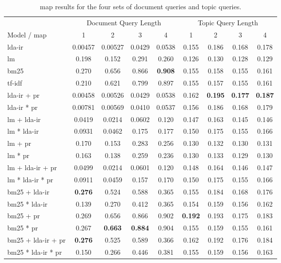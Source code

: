 \begin{table*}[h]
	\centering
	\caption{\acrlong{map} results for the four sets of document queries and topic queries.}
	\begin{tabular}{l|c|c|c|c|c|c|c|c}
		& \multicolumn{4}{c|}{Document Query Length} & \multicolumn{4}{c}{Topic Query Length} \\
		Model / \gls{map} & 1 & 2 & 3 & 4 & 1 & 2 & 3 & 4 \\
		\midrule
		\gls{lda}-\gls{ir} & 0.00457 & 0.00527 & 0.0429 & 0.0538 & 0.155 & 0.186 & 0.168 & 0.178 \\
		\gls{lm} & 0.198 & 0.152 & 0.291 & 0.260 & 0.126 & 0.130 & 0.128 & 0.129 \\
		\gls{bm25} & 0.270 & 0.656 & 0.866 & \textbf{0.908} & 0.155 & 0.158 & 0.155 & 0.161 \\
		\gls{tf-idf} & 0.210 & 0.621 & 0.799 & 0.897 & 0.155 & 0.157 & 0.155 & 0.161 \\
		\gls{lda}-\gls{ir} + \gls{pr} & 0.00458 & 0.00526 & 0.0429 & 0.0538 & 0.162 & \textbf{0.195} & \textbf{0.177} & \textbf{0.187} \\
		\gls{lda}-\gls{ir} * \gls{pr} & 0.00781 & 0.00569 & 0.0410 & 0.0537 & 0.156 & 0.186 & 0.168 & 0.179 \\
		\gls{lm} + \gls{lda}-\gls{ir} & 0.0419 & 0.0214 & 0.0602 & 0.120 & 0.147 & 0.163 & 0.145 & 0.146 \\
		\gls{lm} * \gls{lda}-\gls{ir} & 0.0931 & 0.0462 & 0.175 & 0.177 & 0.150 & 0.175 & 0.155 & 0.166 \\
		\gls{lm} + \gls{pr} & 0.170 & 0.153 & 0.283 & 0.256 & 0.130 & 0.132 & 0.130 & 0.131 \\
		\gls{lm} * \gls{pr} & 0.163 & 0.138 & 0.259 & 0.236 & 0.130 & 0.133 & 0.129 & 0.130 \\
		\gls{lm} + \gls{lda}-\gls{ir} + \gls{pr} & 0.0499 & 0.0214 & 0.0601 & 0.120 & 0.148 & 0.164 & 0.146 & 0.147 \\
		\gls{lm} * \gls{lda}-\gls{ir} * \gls{pr} & 0.0911 & 0.0459  & 0.157 & 0.170 & 0.150 & 0.175 & 0.155 & 0.166 \\
		\gls{bm25} + \gls{lda}-\gls{ir} & \textbf{0.276} & 0.524 & 0.588 & 0.365 & 0.155 & 0.184 & 0.168 & 0.176 \\
		\gls{bm25} * \gls{lda}-\gls{ir} & 0.139 & 0.270 & 0.412 & 0.365 & 0.154 & 0.159 & 0.156 & 0.162 \\
		\gls{bm25} + \gls{pr} & 0.269 & 0.656 & 0.866 & 0.902 & \textbf{0.192} & 0.193 & 0.175 & 0.183 \\
		\gls{bm25} * \gls{pr} & 0.267 & \textbf{0.663} & \textbf{0.884} & 0.904 & 0.155 & 0.159 & 0.155 & 0.161 \\
		\gls{bm25} + \gls{lda}-\gls{ir} + \gls{pr} & \textbf{0.276} & 0.525 & 0.589 & 0.366 & 0.162 & 0.192 & 0.176 & 0.184 \\
		\gls{bm25} * \gls{lda}-\gls{ir} * \gls{pr} & 0.150 & 0.266 & 0.446 & 0.381 & 0.155 & 0.159 & 0.156 & 0.163 \\
	\end{tabular}
	
	\label{tab:results}
\end{table*}


